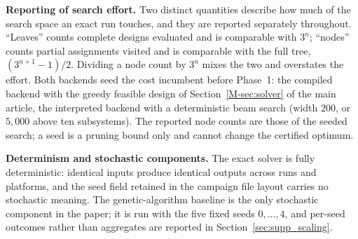 \documentclass[11pt]{article}
\begin{document}
\textbf{Reporting of search effort.} Two distinct quantities describe how much of the search space an
exact run touches, and they are reported separately throughout. ``Leaves'' counts complete designs
evaluated and is comparable with $3^{n}$; ``nodes'' counts partial assignments visited and is
comparable with the full tree, $(3^{n+1}-1)/2$. Dividing a node count by $3^{n}$ mixes the two and
overstates the effort. Both backends seed the cost incumbent before Phase~1: the compiled backend with the greedy feasible design of Section~\ref*{M-sec:solver} of the main article, the interpreted backend with a deterministic beam search (width $200$, or $5{,}000$ above ten subsystems). The reported node counts are those of the seeded search; a seed is a pruning bound only and cannot change the certified optimum.

\textbf{Determinism and stochastic components.} The exact solver is fully deterministic: identical
inputs produce identical outputs across runs and platforms, and the seed field retained in the
campaign file layout carries no stochastic meaning. The genetic-algorithm baseline is the only
stochastic component in the paper; it is run with the five fixed seeds $0,\dots,4$, and per-seed
outcomes rather than aggregates are reported in Section~\ref{sec:supp_scaling}.
\end{document}
